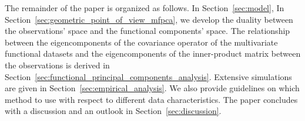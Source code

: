 The remainder of the paper is organized as follows. In Section~\ref{sec:model},  In Section~\ref{sec:geometric_point_of_view_mfpca}, we develop the duality between the observations' space and the functional components' space. The relationship between the eigencomponents of the covariance operator of the multivariate functional datasets and the eigencomponents of the inner-product matrix between the observations is derived in Section~\ref{sec:functional_principal_components_analysis}. Extensive simulations are given in Section~\ref{sec:empirical_analysis}. We also provide guidelines on which method to use with respect to different data characteristics. The paper concludes with a discussion and an outlook in Section~\ref{sec:discussion}.

